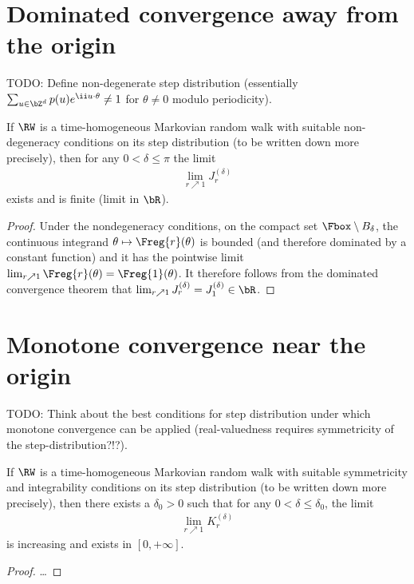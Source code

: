 \section{Dominated convergence away from the origin}

TODO: Define non-degenerate step distribution (essentially $\sum_{u\in \bZ^d} p(u) e^{\ii u \cdot \theta} \ne 1$ for $\theta \ne 0$ modulo periodicity).

\begin{lemma}
  \label{lem:high_frequency_integral}
  If $\RW$ is a time-homogeneous Markovian random walk with suitable
  non-degeneracy conditions on its step distribution (to be written down more precisely),
  then for any $0 < \delta \le \pi$ the limit
  \begin{align*}
  \lim_{r \nearrow 1} J_r^{(\delta)}
  \end{align*}
  exists and is finite (limit in $\bR$).
\end{lemma}
\begin{proof}
Under the nondegeneracy conditions, on the compact set $\Fbox \setminus B_\delta$,
the continuous integrand $\theta \mapsto \Freg{r}(\theta)$
is bounded (and therefore dominated by a constant function) and
it has the pointwise limit $\lim_{r \nearrow 1} \Freg{r}(\theta) = \Freg{1}(\theta)$.
It therefore follows from the dominated convergence theorem
that $\lim_{r \nearrow 1} J_r^{(\delta)} = J_1^{(\delta)} \in \bR$.
\end{proof}

\section{Monotone convergence near the origin}

TODO: Think about the best conditions for step distribution under which monotone convergence can be applied (real-valuedness requires symmetricity of the step-distribution?!?).

\begin{lemma}
  \label{lem:low_frequency_integral}
  If $\RW$ is a time-homogeneous Markovian random walk with suitable
  symmetricity and integrability conditions on its step distribution (to be written down more precisely),
  then there exists a $\delta_0 > 0$ such that for any $0 < \delta \le \delta_0$, the limit
  \begin{align*}
  \lim_{r \nearrow 1} K_r^{(\delta)}
  \end{align*}
  is increasing and exists in $[0,+\infty]$.
\end{lemma}
\begin{proof}
\ldots
\end{proof}

